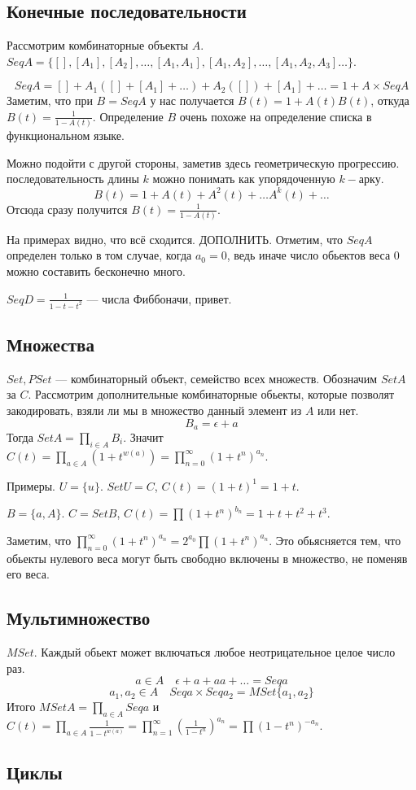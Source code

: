 \subsection*{Конечные последовательности}
Рассмотрим комбинаторные объекты $A$. 
$Seq A = \{[], [A_1], [A_2], \ldots, [A_1, A_1], [A_1, A_2], \ldots, [A_1,A_2,A_3]\ldots  \}$.

\[ Seq A = [] + A_1([] + [A_1] + \ldots) + A_2([]) + [A_1] + \ldots = 1 + A \times Seq A \]
Заметим, что при $B = Seq A$ у нас получается $B(t) = 1 + A(t) B(t)$, откуда $B(t) = \frac{1}{1-{A(t)}}$.
Определение $B$ очень похоже на определение списка в функциональном языке.

Можно подойти с другой стороны, заметив здесь геометрическую прогрессию.
последовательность длины $k$ можно понимать как упорядоченную $k-$арку. 
\[ B(t) = 1 + A(t) + A^2(t) + \ldots A^k(t) + \ldots\] 
Отсюда сразу получится $B(t) = \frac{1}{1-{A(t)}}$.

На примерах видно, что всё сходится. ДОПОЛНИТЬ.
Отметим, что $Seq A$ определен только в том случае, когда $a_0 = 0$, ведь иначе число обьектов веса 0 можно составить бесконечно много.

$Seq D = \frac{1}{1-t-t^2}$ --- числа Фиббоначи, привет.

\subsection*{Множества}
$Set, PSet$ --- комбинаторный объект, семейство всех множеств.
Обозначим $Set A$ за $C$.
Рассмотрим дополнительные комбинаторные обьекты, которые позволят закодировать, взяли ли мы в множество данный элемент из $A$ или нет.
\[B_a = \epsilon + a \]
Тогда $Set A = \prod_{i\in A}B_i$.
Значит $C(t) = \prod_{a\in A}(1 + t^{w(a)}) = \prod_{n=0}^\infty (1+t^n)^{a_n}$.

Примеры. 
$U = \{ u \}$. 
$Set U = C$, $C(t) = (1+t)^1 = 1+t$.

$B = \{ a, A \}$.
$C = Set B$, $C(t) = \prod (1+t^n)^{b_n} = 1 + t + t^2 + t^3$.

Заметим, что $\prod_{n=0}^\infty (1+t^n)^{a_n} = 2^{a_0} \prod (1+t^n)^{a_n}$.
Это обьясняется тем, что обьекты нулевого веса могут быть свободно включены в множество, не поменяв его веса.

\subsection*{Мультимножество}
$MSet$. 
Каждый обьект может включаться любое неотрицательное целое число раз.
\[a\in A \quad \epsilon + a + aa + \ldots  = Seq {a}\]
\[a_1, a_2\in A \quad Seq{a} \times Seq{a_2} = MSet \{ a_1 , a_2 \} \]
Итого $MSet A = \prod_{a\in A}Seq{a}$ и  $C(t) = \prod_{a\in A}\frac{1}{1-t^{w(a)}} = \prod_{n=1}^\infty(\frac{1}{1-t^n})^{a_n} = \prod (1-t^n)^{-a_n}.$

\subsection*{Циклы}

\endinput